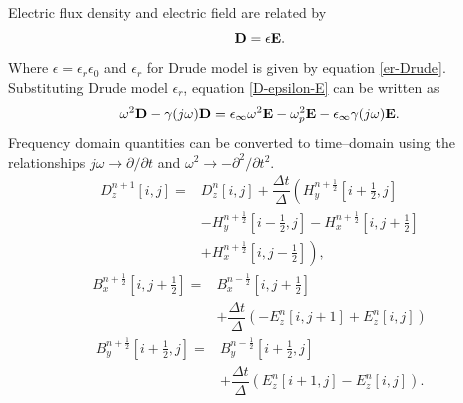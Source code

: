 \documentclass[portrait,final,a1paper,fontscale=0.4]{baposter}
\begin{document}
\begin{poster}
{\begin{minipage}{\linewidth}
  \end{minipage}
  }
  {
Electric flux density and electric field are related by
\begin{equation}
\centering
\textbf{D} = \epsilon \textbf{E}.
\label{D-epsilon-E}
\end{equation}
Where $\epsilon = \epsilon_r\epsilon_0$ and $\epsilon_r$ for Drude model is given by equation \ref{er-Drude}. Substituting Drude model $\epsilon_r$, equation \ref{D-epsilon-E} can be written as
\begin{equation}
\centering
\omega^2\textbf{D}-\gamma(j\omega)\textbf{D} = \epsilon_\infty\omega^2\textbf{E}-\omega^2_p\textbf{E}-\epsilon_\infty \gamma(j\omega)\textbf{E}.
\label{D-epsilonomega-E-frequency-domain}
\end{equation}
Frequency domain quantities can be converted to time--domain using the relationships $j\omega \rightarrow \partial/\partial t$ and $\omega^2 \rightarrow - \partial^2/\partial t^2$. 
\begin{equation}
\begin{split}
D^{n+1}_z \left[i,j\right]=&D^{n}_z \left[i,j\right]+\dfrac{\Delta t}{\Delta}\left(H^{n+\frac{1}{2}}_y\left[i+\frac{1}{2},j\right]\right.\\
&\left.-H^{n+\frac{1}{2}}_y \left[i-\frac{1}{2},j\right]-H^{n+\frac{1}{2}}_x \left[i,j+\frac{1}{2}\right]\right.\\
&\left.+H^{n+\frac{1}{2}}_x \left[i,j-\frac{1}{2}\right]\right),
\end{split}
\label{eq:Dz-2D-FDTD-TMz}
\end{equation}
\begin{equation}
\begin{split}
B^{n+\frac{1}{2}}_x \left[i,j+\frac{1}{2}\right]=&B^{n-\frac{1}{2}}_x \left[i,j+\frac{1}{2}\right]\\& + \dfrac{\Delta t}{\Delta} \left(-E^{n}_z \left[i,j+1\right] + E^{n}_z \left[i,j\right] \right)
\end{split}
\label{eq:Bx-2D-FDTD-TMz}
\end{equation}
\begin{equation}
\begin{split}
B^{n+\frac{1}{2}}_y \left[i+\frac{1}{2},j\right]=&B^{n-\frac{1}{2}}_y \left[i+\frac{1}{2},j\right]\\& + \dfrac{\Delta t}{\Delta} \left( E^{n}_z \left[i+1,j\right] - E^{n}_z \left[i,j\right] \right).

\end{split}
\end{equation}}
\end{poster}
\end{document}
